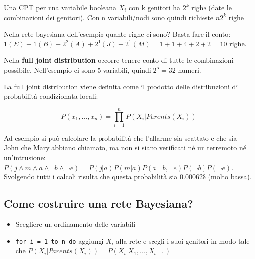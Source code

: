 Una CPT per una variabile booleana $X_i$ con k genitori ha $2^k$ righe (date le combinazioni dei genitori). Con n variabili/nodi sono quindi richieste $n2^k$ righe

Nella rete bayesiana dell'esempio quante righe ci sono? Basta fare il conto: $1 (E) + 1 (B) + 2^2 (A) + 2^1 (J) + 2^1 (M) = 1 + 1 + 4 + 2 + 2 = 10$ righe.

Nella \textbf{full joint distribution} occorre tenere conto di tutte le combinazioni possibile. Nell'esempio ci sono 5 variabili, quindi $2^5 = 32$ numeri.

La full joint distribution viene definita come il prodotto delle distribuzioni di probabilità condizionata locali: 

\begin{equation}
 P(x_1, ..., x_n) = \prod_{i=1}^n P(X_i | Parents(X_i))
\end{equation}

Ad esempio si può calcolare la probabilità che l'allarme sia scattato e che sia John che Mary abbiano chiamato, ma non si siano verificati né un terremoto né un'intrusione:\\

$P(j \land m \land a \land \neg b \land \neg e) = P(j|a)P(m|a)P(a|\neg b, \neg e) P(\neg b) P(\neg e)$.\\

Svolgendo tutti i calcoli risulta che questa probabilità sia 0.000628 (molto bassa).

\subsection{Come costruire una rete Bayesiana?}

\begin{itemize}
 \item Scegliere un ordinamento delle variabili
 \item \texttt{for i = 1 to n do} aggiungi $X_i$ alla rete e scegli i suoi genitori in modo tale che $P(X_i | Parents(X_i)) = P(X_i| X_1, ..., X_{i-1})$
\end{itemize}
